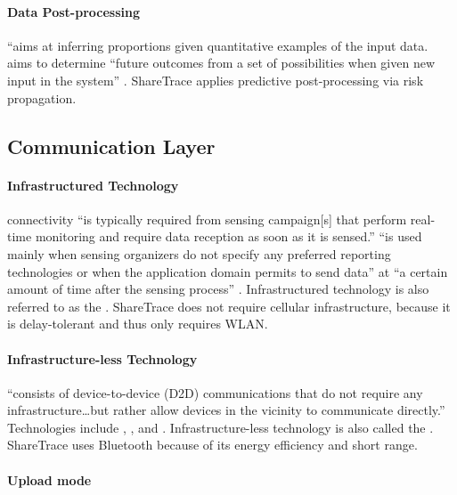 \paragraph{Data Post-processing}

 ``aims at inferring proportions given quantitative examples of the input data.  aims to determine ``future outcomes from a set of possibilities when given new input in the system'' \citep{Capponi2019}. ShareTrace applies predictive post-processing via risk propagation.

\subsection{Communication Layer}

\paragraph{Infrastructured Technology}

 connectivity ``is typically required from sensing campaign[s] that perform real-time monitoring and require data reception as soon as it is sensed.''  ``is used mainly when sensing organizers do not specify any preferred reporting technologies or when the application domain permits to send data'' at ``a certain amount of time after the sensing process'' \citep{Capponi2019}. Infrastructured technology is also referred to as the  \citep{Ma2014}. ShareTrace does not require cellular infrastructure, because it is delay-tolerant and thus only requires WLAN.

\paragraph{Infrastructure-less Technology}

 ``consists of device-to-device (D2D) communications that do not require any infrastructure{\ldots}but rather allow devices in the vicinity to communicate directly.'' Technologies include , , and  \citep{Capponi2019}. Infrastructure-less technology is also called the  \citep{Ma2014}. ShareTrace uses Bluetooth because of its energy efficiency and short range.

\paragraph{Upload mode}

